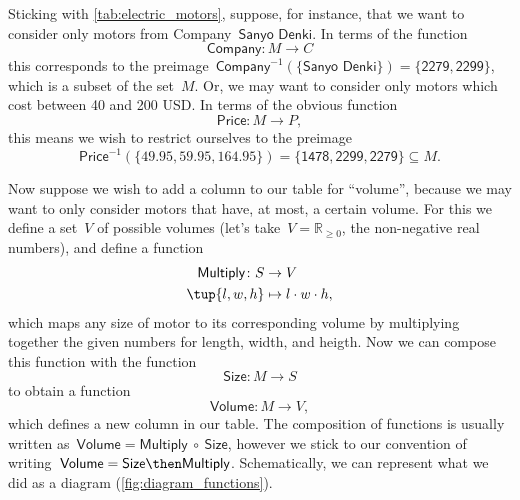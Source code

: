 Sticking with \cref{tab:electric_motors}, suppose, for instance, that we want to consider only motors from Company~$\textsf{Sanyo Denki}$. In terms of the function
\begin{equation*}
\textsf{Company}\colon M \to C
\end{equation*}
this corresponds to the preimage~$\textsf{Company}^{-1}(\{ \textsf{Sanyo Denki} \}) = \{ \textsf{2279}, \textsf{2299}\}$, which is a subset of the set~$M$. Or, we may want to consider only motors which cost between 40 and 200 USD. In terms of the obvious function
\begin{equation*}
\textsf{Price}\colon M \to P,
\end{equation*}
this means we wish to restrict ourselves to the preimage
\begin{equation*}
\textsf{Price}^{-1}(\{ 49.95, 59.95, 164.95\}) = \{ \textsf{1478}, \textsf{2299}, \textsf{2279} \} \subseteq M.
\end{equation*}

Now suppose we wish to add a column to our table for ``volume'', because we may want to only consider motors that have, at most, a certain volume. For this we define a set~$V$ of possible volumes (let's take~$V = \mathbb{R}_{\geq 0}$, the non-negative real numbers), and define a function
\begin{equation*}
\begin{aligned}
\textsf{Multiply}\colon S &\to V\\
\tup{l, w, h} &\mapsto l \cdot w \cdot h,
\end{aligned}
\end{equation*}
which maps any size of motor to its corresponding volume by multiplying together the given numbers for length, width, and heigth.  Now we can compose this function with the function
\begin{equation*}
\textsf{Size}\colon M \to S
\end{equation*}
to obtain a function
\begin{equation*}
\textsf{Volume}\colon M \to V,
\end{equation*}
which defines a new column in our table. The composition of functions is usually written as~$\textsf{Volume} = \textsf{Multiply} \ \circ \ \textsf{Size}$, however we stick to our convention of writing~$\textsf{Volume} = \textsf{Size} \then \textsf{Multiply}$. Schematically, we can represent what we did as a diagram (\cref{fig:diagram_functions}).



